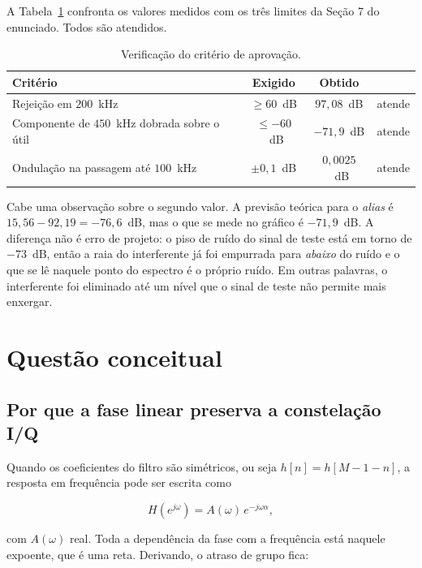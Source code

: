 A Tabela~\ref{tab:aprovacao} confronta os valores medidos com os três limites da Seção 7 do enunciado. Todos são atendidos.

\begin{table}[htb]
\centering
\caption{Verificação do critério de aprovação.}
\label{tab:aprovacao}
\begin{tabular}{lccc}
\hline
\textbf{Critério} & \textbf{Exigido} & \textbf{Obtido} & \\
\hline
Rejeição em $200$~kHz & $\ge 60$~dB & $97{,}08$~dB & atende \\
Componente de $450$~kHz dobrada sobre o útil & $\le -60$~dB & $-71{,}9$~dB & atende \\
Ondulação na passagem até $100$~kHz & $\pm 0{,}1$~dB & $0{,}0025$~dB & atende \\
\hline
\end{tabular}
\end{table}

Cabe uma observação sobre o segundo valor. A previsão teórica para o \textit{alias} é $15{,}56 - 92{,}19 = -76{,}6$~dB, mas o que se mede no gráfico é $-71{,}9$~dB. A diferença não é erro de projeto: o piso de ruído do sinal de teste está em torno de $-73$~dB, então a raia do interferente já foi empurrada para \emph{abaixo} do ruído e o que se lê naquele ponto do espectro é o próprio ruído. Em outras palavras, o interferente foi eliminado até um nível que o sinal de teste não permite mais enxergar.

\section{Questão conceitual}
\label{sec:conceitual}

\subsection{Por que a fase linear preserva a constelação I/Q}

Quando os coeficientes do filtro são simétricos, ou seja $h[n] = h[M-1-n]$, a resposta em frequência pode ser escrita como

\begin{equation}
H(e^{j\omega}) = A(\omega)\,e^{-j\omega\alpha},
\end{equation}

com $A(\omega)$ real. Toda a dependência da fase com a frequência está naquele expoente, que é uma reta. Derivando, o atraso de grupo fica:

